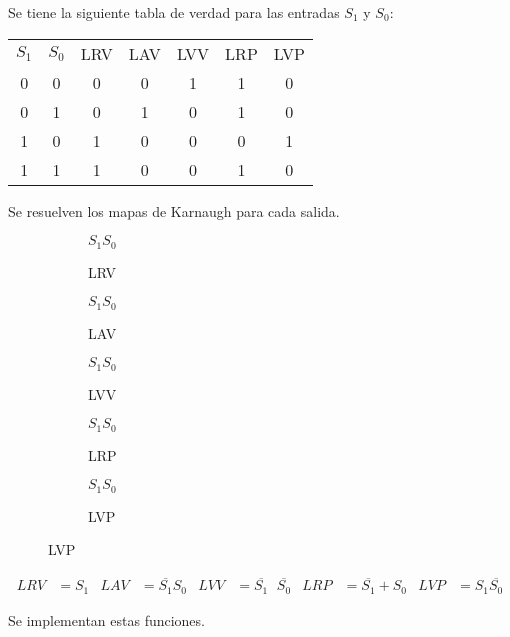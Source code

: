 

Se tiene la siguiente tabla de verdad para las entradas $S_1$ y $S_0$:

\begin{table}[H]
  \centering
  \begin{tabular}{c c c c c c c}
    \toprule
    $S_1$ & $S_0$ & LRV & LAV & LVV & LRP & LVP \\ \cmidrule(r){1-2} \cmidrule(l){3-7}
    0     & 0     & 0   & 0   & 1   & 1   & 0  \\ \cmidrule(r){1-2} \cmidrule(l){3-7}
    0     & 1     & 0   & 1   & 0   & 1   & 0  \\ \cmidrule(r){1-2} \cmidrule(l){3-7}
    1     & 0     & 1   & 0   & 0   & 0   & 1  \\ \cmidrule(r){1-2} \cmidrule(l){3-7}
    1     & 1     & 1   & 0   & 0   & 1   & 0  \\
    \bottomrule
  \end{tabular}
\end{table}

Se resuelven los mapas de Karnaugh para cada salida.

\begin{figure}[H]
  \begin{subfigure}{0.19\textwidth}
    \centering
    \begin{Karnaughquatre}{$S_1$}{$S_0$}
    \end{Karnaughquatre}
    \caption{LRV}
  \end{subfigure}
  \begin{subfigure}{0.19\textwidth}
    \centering
    \begin{Karnaughquatre}{$S_1$}{$S_0$}
    \end{Karnaughquatre}
    \caption{LAV}
  \end{subfigure}
  \begin{subfigure}{0.19\textwidth}
    \centering
    \begin{Karnaughquatre}{$S_1$}{$S_0$}
    \end{Karnaughquatre}
    \caption{LVV}
  \end{subfigure}
  \begin{subfigure}{0.19\textwidth}
    \centering
    \begin{Karnaughquatre}{$S_1$}{$S_0$}
    \end{Karnaughquatre}
    \caption{LRP}
  \end{subfigure}
  \begin{subfigure}{0.19\textwidth}
    \centering
    \begin{Karnaughquatre}{$S_1$}{$S_0$}
    \end{Karnaughquatre}
    \caption{LVP}
  \end{subfigure}
\end{figure}

\begin{align*}
  LRV &= S_1 &
  LAV &= \overline{S_1} S_0 &
  LVV &= \overline{S_1} \phantom{\cdot} \overline{S_0} &
  LRP &= \overline{S_1} + S_0 &
  LVP &= S_1 \overline{S_0}
\end{align*}

Se implementan estas funciones.
